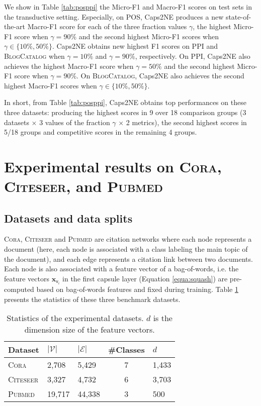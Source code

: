 \documentclass[sigconf]{acmart}
\begin{document}
We show in Table \ref{tab:posppi} the Micro-F1 and Macro-F1 scores on test sets in the transductive setting. Especially, on POS, Caps2NE produces a new state-of-the-art Macro-F1 score for each of the three fraction values $\gamma$, the highest Micro-F1 score when $\gamma = 90\%$ and the second highest Micro-F1  scores when  $\gamma \in \{10\%, 50\%\}$. Caps2NE   obtains new highest F1 scores on PPI and \textsc{BlogCatalog} when $\gamma = 10\%$ and $\gamma = 90\%$, respectively. On PPI, Caps2NE also achieves the highest Macro-F1 score  when $\gamma = 50\%$ and the second highest Micro-F1 score  when $\gamma = 90\%$. On \textsc{BlogCatalog}, Caps2NE also achieves the second highest Macro-F1 scores  when   $\gamma \in \{10\%, 50\%\}$. 

In short, from Table \ref{tab:posppi}, Caps2NE obtains top performances on these  three datasets: producing the highest scores in 9 over 18 comparison groups (3 datasets $\times$ 3 values of the fraction $\gamma$ $\times$ 2 metrics), the second  highest scores in 5/18 groups and competitive scores in the remaining 4 groups.


\section{Experimental results on \textsc{Cora, Citeseer}, and \textsc{Pubmed}}

\subsection{Datasets and data splits}

\textsc{Cora, Citeseer} \citep{sen2008collective} and \textsc{Pubmed} \citep{namata:mlg12} are citation networks where each node represents a document (here, each node is associated with a class labeling the main topic of the document), and each edge represents a citation link between two documents.  
Each node is also associated with a feature vector of a bag-of-words, i.e. the feature vectors $\boldsymbol{x}_{\mathsf{v}_i}$ in the first capsule layer (Equation \ref{equa:squash}) are pre-computed based on bag-of-words features and fixed during training.
Table \ref{tab:graphdatasets} presents the statistics of these three benchmark datasets.

\begin{table}[!ht]
\centering
\caption{Statistics of the experimental datasets. $d$ is the dimension size of the feature vectors.}
\def\arraystretch{1.1}
\begin{tabular}{l|llcl}
\hline
\bf Dataset &  \bf{$|\mathcal{V}|$} & \bf{$|\mathcal{E}|$} & {\#Classes} & $d$\\
\hline
\textsc{Cora} & 2,708 & 5,429 & 7 & 1,433\\
\textsc{Citeseer} & 3,327 & 4,732 & 6 & 3,703\\
\textsc{Pubmed} & 19,717 & 44,338 & 3 & 500\\
\hline
\end{tabular}
\label{tab:graphdatasets}
\end{table}
\end{document}

